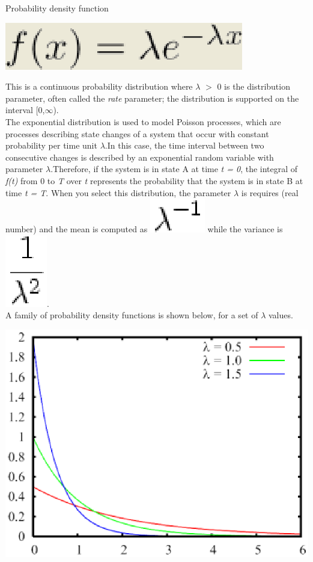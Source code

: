 Probability density function\\
\begin{center}
\includegraphics[scale=.5]{img/jsim/exponential1.eps}
\end{center}
This is a continuous probability distribution where $\lambda$ $>$ 0 is the distribution parameter, often called the \emph{rate} parameter; the distribution is supported on the interval [0,$\infty$).\\
The exponential distribution is used to model Poisson  processes, which are processes describing state changes of a system that occur  with constant probability per time unit $\lambda$.In this case, the time interval between two consecutive changes is
described by an exponential random variable with parameter $\lambda$.Therefore, if the system is in state A at time \emph{t = 0}, the integral of \emph{f(t)} from 0 to \emph{T} over \emph{t} represents the  probability that the system is in state B at
time \emph{t = T}. When you select this distribution, the parameter $\lambda$ is requires (real number) and the mean is computed as \includegraphics[scale=.3]{img/jsim/exponential2.eps} while the variance is \includegraphics[scale=.3]{img/jsim/expo_var.eps}.\\
A family of probability density functions is shown below, for a set of $\lambda$ values.\\
\begin{center}
\includegraphics[scale=.5]{img/jsim/exp_pdf.eps}
\end{center}
